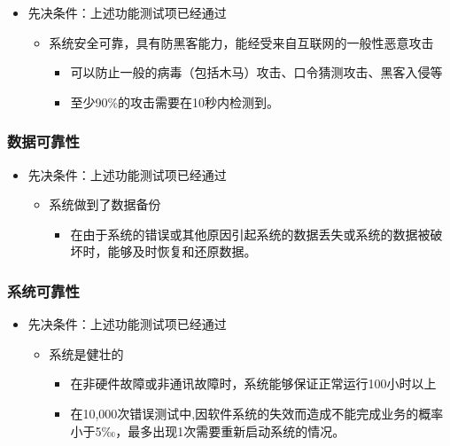 \documentclass[hyperref, a4paper]{ctexart}
\providecommand{\tightlist}{%
  \setlength{\itemsep}{0pt}\setlength{\parskip}{0pt}}
\begin{document}
\begin{itemize}
\tightlist
\item
  先决条件：上述功能测试项已经通过

  \begin{itemize}
  \tightlist
  \item
    系统安全可靠，具有防黑客能力，能经受来自互联网的一般性恶意攻击

    \begin{itemize}
    \tightlist
    \item
      可以防止一般的病毒（包括木马）攻击、口令猜测攻击、黑客入侵等
    \item
      至少90\%的攻击需要在10秒内检测到。
    \end{itemize}
  \end{itemize}
\end{itemize}

\hypertarget{ux6570ux636eux53efux9760ux6027}{%
\subsubsection{数据可靠性}\label{ux6570ux636eux53efux9760ux6027}}

\begin{itemize}
\tightlist
\item
  先决条件：上述功能测试项已经通过

  \begin{itemize}
  \tightlist
  \item
    系统做到了数据备份

    \begin{itemize}
    \tightlist
    \item
      在由于系统的错误或其他原因引起系统的数据丢失或系统的数据被破坏时，能够及时恢复和还原数据。
    \end{itemize}
  \end{itemize}
\end{itemize}

\hypertarget{ux7cfbux7edfux53efux9760ux6027}{%
\subsubsection{系统可靠性}\label{ux7cfbux7edfux53efux9760ux6027}}

\begin{itemize}
\tightlist
\item
  先决条件：上述功能测试项已经通过

  \begin{itemize}
  \tightlist
  \item
    系统是健壮的

    \begin{itemize}
    \tightlist
    \item
      在非硬件故障或非通讯故障时，系统能够保证正常运行100小时以上
    \item
      在10,000次错误测试中,因软件系统的失效而造成不能完成业务的概率小于5‰，最多出现1次需要重新启动系统的情况。
    \end{itemize}
  \end{itemize}
\end{itemize}
\end{document}
